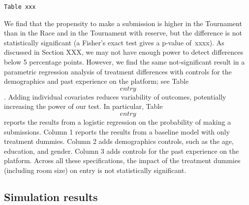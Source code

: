 \documentclass[12pt,]{article}
\begin{document}
\begin{verbatim}
Table xxx
\end{verbatim}

We find that the propensity to make a submission is higher in the
Tournament than in the Race and in the Tournament with reserve, but the
difference is not statistically significant (a Fisher's exact test gives
a p-value of~xxxx). As discussed in Section XXX, we may not have enough
power to detect differences below 5 percentage points. However, we find
the same not-significant result in a parametric regression analysis of
treatment differences with controls for the demographics and past
experience on the platform; see Table \[entry\]. Adding individual
covariates reduces variability of outcomes, potentially increasing the
power of our test. In particular, Table \[entry\] reports the results
from a logistic regression on the probability of making a submissions.
Column 1 reports the results from a baseline model with only treatment
dummies. Column 2 adds demographics controls, such as the age,
education, and gender. Column 3 adds controls for the past experience on
the platform. Across all these specifications, the impact of the
treatment dummies (including room size) on entry is not statistically
significant.

\subsection{Simulation results}\label{simulation-results-1}

\renewcommand\refname{References}

\end{document}
